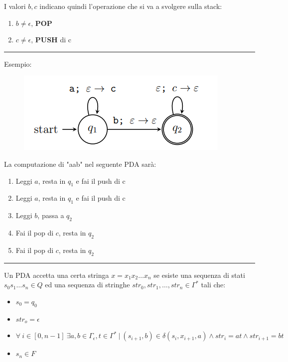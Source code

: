 \documentclass{article}
\begin{document}
\noindent I valori $b,c$ indicano quindi l'operazione che si va a svolgere sulla stack:
\begin{enumerate}
    \item $b\neq \epsilon$, \textbf{POP}
    \item $c\neq \epsilon$, \textbf{PUSH} di c\newline
\end{enumerate}

\noindent\rule{\textwidth}{0.5pt}\newline

\noindent Esempio:\newline

\begin{figure}[ht]
    \centering
    \includegraphics[width=0.5\linewidth]{PDA.png}
    \label{fig:PDA}
\end{figure}

\noindent La computazione di "aab" nel seguente PDA sarà:
\begin{enumerate}
    \item Leggi $a$, resta in $q_1$ e fai il push di c
    \item Leggi $a$, resta in $q_1$ e fai il push di c
    \item Leggi $b$, passa a $q_2$
    \item Fai il pop di $c$, resta in $q_2$
    \item Fai il pop di $c$, resta in $q_2$
\end{enumerate}

\noindent\rule{\textwidth}{0.5pt}\newline

\noindent Un PDA accetta una certa stringa $x=x_1x_2\ldots x_n$ se esiste una sequenza di stati $s_0s_1\ldots s_n\in Q$ ed una sequenza di stringhe $str_0,str_1,\ldots,str_n\in\Gamma^*$ tali che:
\begin{itemize}
    \item $s_0=q_0$
    \item $str_o=\epsilon$
    \item $\forall\ i \in [0,n-1]\ \exists a,b\in\Gamma_\epsilon ,t\in\Gamma^*\ |\ (s_{i+1},b)\in\delta(s_i,x_{i+1},a)\land str_i=at\land str_{i+1}=bt$ 
    \item $s_n\in F$\newline
\end{itemize}
\end{document}
